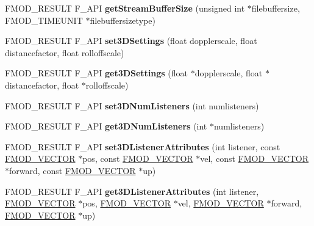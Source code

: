 \begin{DoxyCompactItemize}
\item 
\hypertarget{class_f_m_o_d_1_1_system_a363f5ab0586dd5a10e091986fc2e6a3f}{F\+M\+O\+D\+\_\+\+R\+E\+S\+U\+L\+T F\+\_\+\+A\+P\+I {\bfseries get\+Stream\+Buffer\+Size} (unsigned int $\ast$filebuffersize, F\+M\+O\+D\+\_\+\+T\+I\+M\+E\+U\+N\+I\+T $\ast$filebuffersizetype)}\label{class_f_m_o_d_1_1_system_a363f5ab0586dd5a10e091986fc2e6a3f}

\item 
\hypertarget{class_f_m_o_d_1_1_system_a107414e588b619f0883570efa92da2ca}{F\+M\+O\+D\+\_\+\+R\+E\+S\+U\+L\+T F\+\_\+\+A\+P\+I {\bfseries set3\+D\+Settings} (float dopplerscale, float distancefactor, float rolloffscale)}\label{class_f_m_o_d_1_1_system_a107414e588b619f0883570efa92da2ca}

\item 
\hypertarget{class_f_m_o_d_1_1_system_a3d437ae627c22704714a274c310b8966}{F\+M\+O\+D\+\_\+\+R\+E\+S\+U\+L\+T F\+\_\+\+A\+P\+I {\bfseries get3\+D\+Settings} (float $\ast$dopplerscale, float $\ast$distancefactor, float $\ast$rolloffscale)}\label{class_f_m_o_d_1_1_system_a3d437ae627c22704714a274c310b8966}

\item 
\hypertarget{class_f_m_o_d_1_1_system_a33a3a5b785baf3eb09a7428ea2beb495}{F\+M\+O\+D\+\_\+\+R\+E\+S\+U\+L\+T F\+\_\+\+A\+P\+I {\bfseries set3\+D\+Num\+Listeners} (int numlisteners)}\label{class_f_m_o_d_1_1_system_a33a3a5b785baf3eb09a7428ea2beb495}

\item 
\hypertarget{class_f_m_o_d_1_1_system_a6909226f2d3f918a3a6900e35476cdbc}{F\+M\+O\+D\+\_\+\+R\+E\+S\+U\+L\+T F\+\_\+\+A\+P\+I {\bfseries get3\+D\+Num\+Listeners} (int $\ast$numlisteners)}\label{class_f_m_o_d_1_1_system_a6909226f2d3f918a3a6900e35476cdbc}

\item 
\hypertarget{class_f_m_o_d_1_1_system_a0e24af3c714aab78000e13cf522a3bfc}{F\+M\+O\+D\+\_\+\+R\+E\+S\+U\+L\+T F\+\_\+\+A\+P\+I {\bfseries set3\+D\+Listener\+Attributes} (int listener, const \hyperlink{struct_f_m_o_d___v_e_c_t_o_r}{F\+M\+O\+D\+\_\+\+V\+E\+C\+T\+O\+R} $\ast$pos, const \hyperlink{struct_f_m_o_d___v_e_c_t_o_r}{F\+M\+O\+D\+\_\+\+V\+E\+C\+T\+O\+R} $\ast$vel, const \hyperlink{struct_f_m_o_d___v_e_c_t_o_r}{F\+M\+O\+D\+\_\+\+V\+E\+C\+T\+O\+R} $\ast$forward, const \hyperlink{struct_f_m_o_d___v_e_c_t_o_r}{F\+M\+O\+D\+\_\+\+V\+E\+C\+T\+O\+R} $\ast$up)}\label{class_f_m_o_d_1_1_system_a0e24af3c714aab78000e13cf522a3bfc}

\item 
\hypertarget{class_f_m_o_d_1_1_system_af141ec87d96230c1c445d6e3c2de224a}{F\+M\+O\+D\+\_\+\+R\+E\+S\+U\+L\+T F\+\_\+\+A\+P\+I {\bfseries get3\+D\+Listener\+Attributes} (int listener, \hyperlink{struct_f_m_o_d___v_e_c_t_o_r}{F\+M\+O\+D\+\_\+\+V\+E\+C\+T\+O\+R} $\ast$pos, \hyperlink{struct_f_m_o_d___v_e_c_t_o_r}{F\+M\+O\+D\+\_\+\+V\+E\+C\+T\+O\+R} $\ast$vel, \hyperlink{struct_f_m_o_d___v_e_c_t_o_r}{F\+M\+O\+D\+\_\+\+V\+E\+C\+T\+O\+R} $\ast$forward, \hyperlink{struct_f_m_o_d___v_e_c_t_o_r}{F\+M\+O\+D\+\_\+\+V\+E\+C\+T\+O\+R} $\ast$up)}\label{class_f_m_o_d_1_1_system_af141ec87d96230c1c445d6e3c2de224a}


\end{DoxyCompactItemize}
